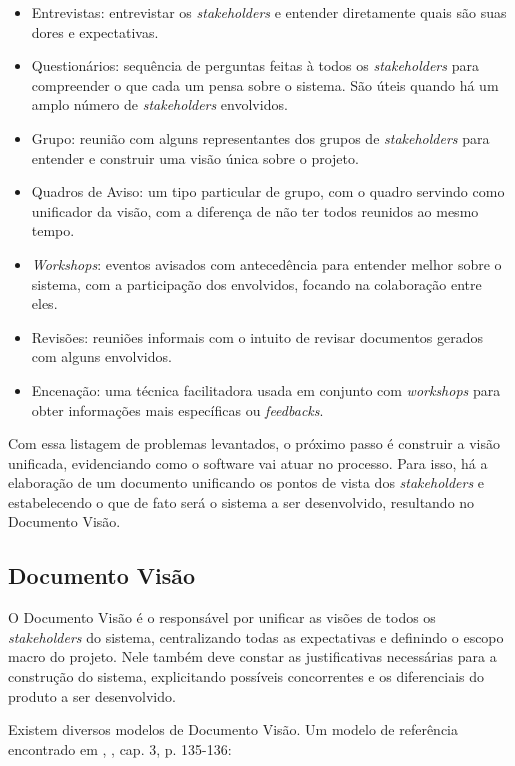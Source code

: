 \begin{itemize}
    \item Entrevistas: entrevistar os \textit{stakeholders} e entender diretamente quais são suas dores e expectativas.
    \item Questionários: sequência de perguntas feitas à todos os \textit{stakeholders} para compreender o que cada um pensa sobre o sistema. São úteis quando há um amplo número de \textit{stakeholders} envolvidos.
    \item Grupo: reunião com alguns representantes dos grupos de \textit{stakeholders} para entender e construir uma visão única sobre o projeto.
    \item Quadros de Aviso: um tipo particular de grupo, com o quadro servindo como unificador da visão, com a diferença de não ter todos reunidos ao mesmo tempo.
    \item \textit{Workshops}: eventos avisados com antecedência para entender melhor sobre o sistema, com a participação dos envolvidos, focando na colaboração entre eles.
    \item Revisões: reuniões informais com o intuito de revisar documentos gerados com alguns envolvidos.
    \item Encenação: uma técnica facilitadora usada em conjunto com \textit{workshops} para obter informações mais específicas ou \textit{feedbacks}.
\end{itemize}

Com essa listagem de problemas levantados, o próximo passo é construir a visão unificada, evidenciando como o software vai atuar no processo. Para isso, há a elaboração de um documento unificando os pontos de vista dos \textit{stakeholders} e estabelecendo o que de fato será o sistema a ser desenvolvido, resultando no Documento Visão.

\subsection{Documento Visão}
O Documento Visão é o responsável por unificar as visões de todos os \textit{stakeholders} do sistema, centralizando todas as expectativas e definindo o escopo macro do projeto. Nele também deve constar as justificativas necessárias para a construção do sistema, explicitando possíveis concorrentes e os diferenciais do produto a ser desenvolvido.

Existem diversos modelos de Documento Visão. Um modelo de referência encontrado em \citeauthor{kurtbittnerianspence2002}, \citeyear{kurtbittnerianspence2002}, cap. 3, p. 135-136:

